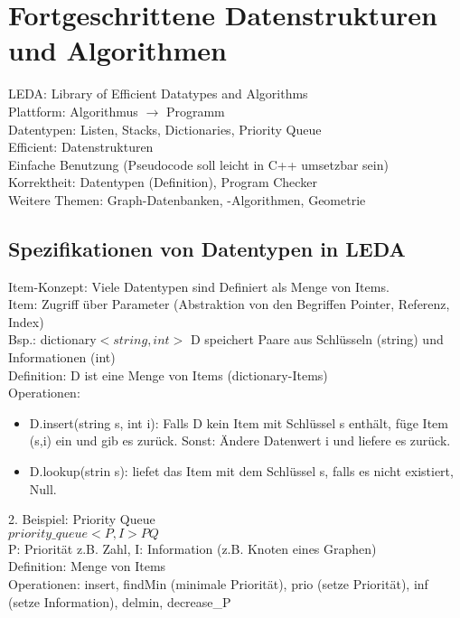 \documentclass[a4paper]{article}
\begin{document}
\section*{Fortgeschrittene Datenstrukturen und Algorithmen}
LEDA: Library of Efficient Datatypes and Algorithms\\
Plattform: Algorithmus $\rightarrow$ Programm\\
Datentypen:  Listen, Stacks, Dictionaries, Priority Queue\\
Efficient: Datenstrukturen\\
Einfache Benutzung (Pseudocode soll leicht in C++ umsetzbar sein)\\
Korrektheit: Datentypen (Definition), Program Checker\\
Weitere Themen: Graph-Datenbanken, -Algorithmen, Geometrie\\
\subsection*{Spezifikationen von Datentypen in LEDA}
Item-Konzept: Viele Datentypen sind Definiert als Menge von Items.\\
Item: Zugriff über Parameter (Abstraktion von den Begriffen Pointer, Referenz, Index)\\
Bsp.: dictionary$<string, int>$ D speichert Paare aus Schlüsseln (string) und Informationen (int)\\
Definition: D ist eine Menge von Items (dictionary-Items)\\
Operationen: \\
\begin{itemize}
\item D.insert(string s, int i): Falls D kein Item mit Schlüssel s enthält, füge Item (s,i) ein und gib es zurück. Sonst: Ändere Datenwert i und liefere es zurück.
\item D.lookup(strin s): liefet das Item mit dem Schlüssel s, falls es nicht existiert, Null.
\end{itemize}
2. Beispiel: Priority Queue\\
$priority\_queue<P,I> PQ$\\
P: Priorität z.B. Zahl, I: Information (z.B. Knoten eines Graphen)\\
Definition: Menge von Items\\
Operationen: insert, findMin (minimale Priorität), prio (setze Priorität), inf (setze Information), delmin, decrease\_P\\
\end{document}
